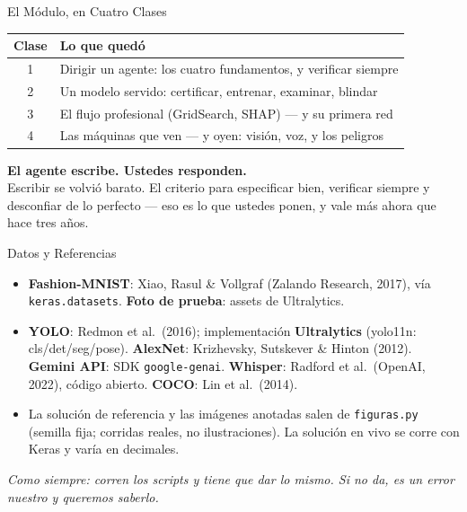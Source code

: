 \documentclass[aspectratio=169, 11pt]{beamer}
\begin{document}
\begin{frame}[shrink=5]{El Módulo, en Cuatro Clases}
  \vspace{2pt}
  \begin{center}
  {\footnotesize
  \begin{tabular}{cl}
    \toprule
    \textbf{Clase} & \textbf{Lo que quedó} \\
    \midrule
    1 & Dirigir un agente: los cuatro fundamentos, y verificar siempre \\[2pt]
    2 & Un modelo servido: certificar, entrenar, examinar, blindar \\[2pt]
    3 & El flujo profesional (GridSearch, SHAP) --- y su primera red \\[2pt]
    4 & Las máquinas que ven --- y oyen: visión, voz, y los peligros \\
    \bottomrule
  \end{tabular}}
  \end{center}
  \vspace{2pt}
  \begin{tcolorbox}[colback=arcaGray, colframe=arcaRed, boxrule=0pt, leftrule=4pt,
    arc=3pt, left=10pt, right=10pt, top=4pt, bottom=4pt]
    {\large\color{arcaDark}\bfseries
     El agente escribe. Ustedes responden.}\\[2pt]
    {\scriptsize\color{textMuted}
     Escribir se volvió barato. El criterio para especificar bien, verificar
     siempre y desconfiar de lo perfecto --- eso es lo que ustedes ponen, y
     vale más ahora que hace tres años.}
  \end{tcolorbox}
\end{frame}

\begin{frame}[shrink=8]{Datos y Referencias}
  \vspace{4pt}
  {\footnotesize\color{textMuted}
  \begin{itemize}\setlength{\itemsep}{5pt}
    \item[{\color{arcaRed}\scriptsize\faDatabase}]
      \textbf{Fashion-MNIST}: Xiao, Rasul \& Vollgraf (Zalando Research,
      2017), vía \texttt{keras.datasets}. \textbf{Foto de prueba}: assets de
      Ultralytics.
    \item[{\color{arcaRed}\scriptsize\faBook}]
      \textbf{YOLO}: Redmon et al.\ (2016); implementación
      \textbf{Ultralytics} (yolo11n: cls/det/seg/pose). \textbf{AlexNet}:
      Krizhevsky, Sutskever \& Hinton (2012). \textbf{Gemini API}: SDK
      \texttt{google-genai}. \textbf{Whisper}: Radford et al.\ (OpenAI,
      2022), código abierto. \textbf{COCO}: Lin et al.\ (2014).
    \item[{\color{arcaRed}\scriptsize\faFileCode}]
      La solución de referencia y las imágenes anotadas salen de
      \texttt{figuras.py} (semilla fija; corridas reales, no ilustraciones).
      La solución en vivo se corre con Keras y varía en decimales.
  \end{itemize}}
  \vspace{7pt}
  {\scriptsize\color{arcaDark}\itshape
   Como siempre: corren los scripts y tiene que dar lo mismo. Si no da, es
   un error nuestro y queremos saberlo.}
\end{frame}
\end{document}
